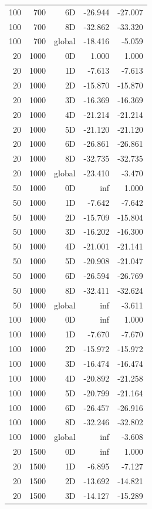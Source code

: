 \begin{longtable}{rrrrr}
100 & 700 & 6D & -26.944 & -27.007 \\
100 & 700 & 8D & -32.862 & -33.320 \\
100 & 700 & global & -18.416 & -5.059 \\
20 & 1000 & 0D & 1.000 & 1.000 \\
20 & 1000 & 1D & -7.613 & -7.613 \\
20 & 1000 & 2D & -15.870 & -15.870 \\
20 & 1000 & 3D & -16.369 & -16.369 \\
20 & 1000 & 4D & -21.214 & -21.214 \\
20 & 1000 & 5D & -21.120 & -21.120 \\
20 & 1000 & 6D & -26.861 & -26.861 \\
20 & 1000 & 8D & -32.735 & -32.735 \\
20 & 1000 & global & -23.410 & -3.470 \\
50 & 1000 & 0D & inf & 1.000 \\
50 & 1000 & 1D & -7.642 & -7.642 \\
50 & 1000 & 2D & -15.709 & -15.804 \\
50 & 1000 & 3D & -16.202 & -16.300 \\
50 & 1000 & 4D & -21.001 & -21.141 \\
50 & 1000 & 5D & -20.908 & -21.047 \\
50 & 1000 & 6D & -26.594 & -26.769 \\
50 & 1000 & 8D & -32.411 & -32.624 \\
50 & 1000 & global & inf & -3.611 \\
100 & 1000 & 0D & inf & 1.000 \\
100 & 1000 & 1D & -7.670 & -7.670 \\
100 & 1000 & 2D & -15.972 & -15.972 \\
100 & 1000 & 3D & -16.474 & -16.474 \\
100 & 1000 & 4D & -20.892 & -21.258 \\
100 & 1000 & 5D & -20.799 & -21.164 \\
100 & 1000 & 6D & -26.457 & -26.916 \\
100 & 1000 & 8D & -32.246 & -32.802 \\
100 & 1000 & global & inf & -3.608 \\
20 & 1500 & 0D & inf & 1.000 \\
20 & 1500 & 1D & -6.895 & -7.127 \\
20 & 1500 & 2D & -13.692 & -14.821 \\
20 & 1500 & 3D & -14.127 & -15.289 \\

\end{longtable}
